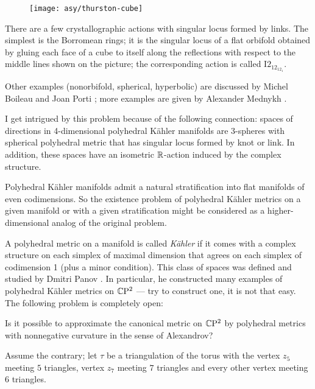 \begin{wrapfigure}{r}{23 mm}
\vskip-4mm
\centering
\texttt{[image: asy/thurston-cube]}
\vskip-4mm
\end{wrapfigure}

There are a few crystallographic actions with singular locus formed by links. 
The simplest is the Borromean rings;
it is the singular locus of a flat orbifold obtained by gluing each face of a cube to itself
along the reflections with respect to the middle lines shown on the picture; the corresponding action is called I$2_12_12_1$. 

Other examples (nonorbifold, spherical, hyperbolic) are discussed by Michel Boileau and Joan Porti \cite[Chapter 9]{boileau-porti};
more examples are given by Alexander Mednykh \cite{mednykh}.

I get intrigued by this problem because of the following connection:
spaces of directions in 4-dimensional polyhedral Kähler manifolds
are 3-spheres with spherical polyhedral metric that has singular locus formed by knot or link.
In addition, these spaces have an isometric $\mathbb{R}$-action induced by the complex structure.

Polyhedral Kähler manifolds admit a natural stratification into flat manifolds of even codimensions.
So the existence problem of polyhedral Kähler metrics on a given manifold or with a given stratification might be considered as a higher-dimensional analog of the original problem.

A polyhedral metric on a manifold is called \emph{Kähler} if it comes with a complex structure on each simplex of maximal dimension that agrees on each simplex of codimension 1 (plus a minor condition).
This class of spaces was defined and studied by Dmitri Panov \cite{panov-Kaeler}.
In particular, he constructed many examples of polyhedral Kähler metrics on 
$\mathbb{C}\mathrm{P}^2$ ---
try to construct one, it is not that easy.
The following problem is completely open:

\begin{pr}
Is it possible to approximate the canonical metric on $\mathbb{C}\mathrm{P}^2$ by polyhedral metrics with nonnegative curvature in the sense of Alexandrov?
\end{pr}

Assume the contrary;
let $\tau$ be a triangulation of the torus with the vertex $z_5$ meeting $5$ triangles,
vertex $z_7$ meeting $7$ triangles 
and every other vertex meeting $6$ triangles.

